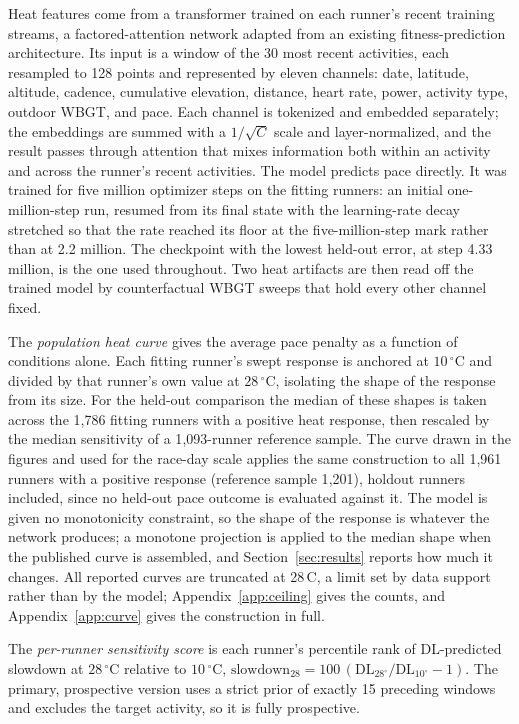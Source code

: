 \documentclass[11pt]{article}
\renewcommand{\_}{\textunderscore\allowbreak}
\begin{document}
Heat features come from a transformer trained on each runner's recent training streams, a factored-attention network adapted from an existing fitness-prediction architecture. Its input is a window of the 30 most recent activities, each resampled to 128 points and represented by eleven channels: date, latitude, altitude, cadence, cumulative elevation, distance, heart rate, power, activity type, outdoor WBGT, and pace. Each channel is tokenized and embedded separately; the embeddings are summed with a $1/\sqrt{C}$ scale and layer-normalized, and the result passes through attention that mixes information both within an activity and across the runner's recent activities. The model predicts pace directly. It was trained for five million optimizer steps on the fitting runners: an initial one-million-step run, resumed from its final state with the learning-rate decay stretched so that the rate reached its floor at the five-million-step mark rather than at 2.2 million. The checkpoint with the lowest held-out error, at step 4.33 million, is the one used throughout. Two heat artifacts are then read off the trained model by counterfactual WBGT sweeps that hold every other channel fixed.

The \emph{population heat curve} gives the average pace penalty as a function of conditions alone. Each fitting runner's swept response is anchored at $10\,^{\circ}$C and divided by that runner's own value at $28\,^{\circ}$C, isolating the shape of the response from its size. For the held-out comparison the median of these shapes is taken across the 1{,}786 fitting runners with a positive heat response, then rescaled by the median sensitivity of a 1{,}093-runner reference sample. The curve drawn in the figures and used for the race-day scale applies the same construction to all 1{,}961 runners with a positive response (reference sample 1{,}201), holdout runners included, since no held-out pace outcome is evaluated against it. The model is given no monotonicity constraint, so the shape of the response is whatever the network produces; a monotone projection is applied to the median shape when the published curve is assembled, and Section~\ref{sec:results} reports how much it changes. All reported curves are truncated at 28\,\textdegree C, a limit set by data support rather than by the model; Appendix~\ref{app:ceiling} gives the counts, and Appendix~\ref{app:curve} gives the construction in full.

The \emph{per-runner sensitivity score} is each runner's percentile rank of DL-predicted slowdown at $28\,^{\circ}$C relative to $10\,^{\circ}$C, $\mathrm{slowdown}_{28} = 100\,(\mathrm{DL}_{28^\circ}/\mathrm{DL}_{10^\circ} - 1)$. The primary, prospective version uses a strict prior of exactly 15 preceding windows and excludes the target activity, so it is fully prospective.
\end{document}
